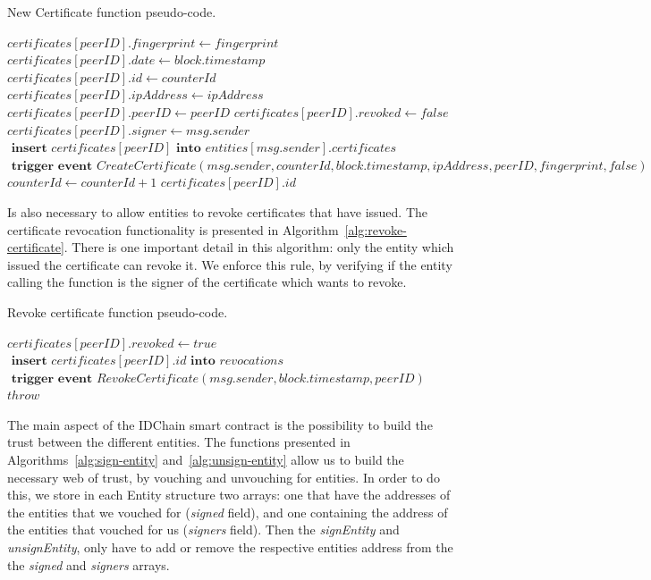 \begin{algorithm}
  \caption{New Certificate function pseudo-code.}
\label{alg:new-certificate}
  \begin{algorithmic}[1]
      \State $certificates[peerID].fingerprint \gets fingerprint$
      \State $certificates[peerID].date \gets block.timestamp$
      \State $certificates[peerID].id \gets counterId$
      \State $certificates[peerID].ipAddress \gets ipAddress$
      \State $certificates[peerID].peerID \gets peerID$
      \State $certificates[peerID].revoked \gets false$
      \State $certificates[peerID].signer \gets msg.sender$
      \State 
      \State $\textbf{ insert } certificates[peerID] \textbf{ into } entities[msg.sender].certificates$
      \State 
      \State $\textbf{ trigger event } CreateCertificate(msg.sender, counterId, block.timestamp,\allowbreak ipAddress, peerID, fingerprint, false)$
      \State
      \State $counterId \gets counterId + 1$
      \State 
      \State 
      \Return $certificates[peerID].id$
    \EndFunction
  \end{algorithmic}
\end{algorithm}


Is also necessary to allow entities to revoke certificates that have issued.
The certificate revocation functionality is presented in Algorithm~\ref{alg:revoke-certificate}.
There is one important detail in this algorithm: only the entity which issued the certificate can revoke it.
We enforce this rule, by verifying if the entity calling the function is the signer of the certificate which wants to revoke.

\begin{algorithm}
  \caption{Revoke certificate function pseudo-code.}
  \label{alg:revoke-certificate}
  \begin{algorithmic}[1]
        \State $certificates[peerID].revoked \gets true$
        \State $\textbf{ insert } certificates[peerID].id \textbf{ into } revocations$
        \State $\textbf{ trigger event } RevokeCertificate(msg.sender, block.timestamp, peerID)$
      \Else
        \State $throw$
      \EndIf
    \EndFunction
  \end{algorithmic}
\end{algorithm}



The main aspect of the IDChain smart contract is the possibility to build the trust between the different entities.
The functions presented in Algorithms~\ref{alg:sign-entity} and~\ref{alg:unsign-entity} allow us to build the necessary web of trust, by vouching and unvouching for entities.
In order to do this, we store in each Entity structure two arrays: one that have the addresses of the entities that we vouched for (\textit{signed} field), and one containing the address of the entities that vouched for us (\textit{signers} field).
Then the \textit{signEntity} and \textit{unsignEntity}, only have to add or remove the respective entities address from the the \textit{signed} and \textit{signers} arrays.

